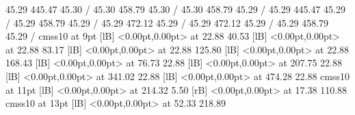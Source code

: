 \documentclass[12pt,a4paper]{report}
\begin{document}
{\setsolid
{} 45.29 445.47 45.30 /
 45.30 458.79 45.30 /
 45.30 458.79 45.29 /
 45.29 445.47 45.29 /
\setsolid
{} 45.29 458.79 45.29 /
 45.29 472.12 45.29 /
 45.29 472.12 45.29 /
 45.29 458.79 45.29 /
\font\picfont cmss10 at 9pt\picfont
{}  [lB] <0.00pt,0.00pt> at 22.88 40.53
  [lB] <0.00pt,0.00pt> at 22.88 83.17
  [lB] <0.00pt,0.00pt> at 22.88 125.80
  [lB] <0.00pt,0.00pt> at 22.88 168.43
  [lB] <0.00pt,0.00pt> at 76.73 22.88
  [lB] <0.00pt,0.00pt> at 207.75 22.88
  [lB] <0.00pt,0.00pt> at 341.02 22.88
  [lB] <0.00pt,0.00pt> at 474.28 22.88
\font\picfont cmss10 at 11pt\picfont
{}  [lB] <0.00pt,0.00pt> at 214.32 5.50
 [rB] <0.00pt,0.00pt> at 17.38 110.88
\font\picfont cmss10 at 13pt\picfont
{}  [lB] <0.00pt,0.00pt> at 52.33 218.89
\endpicture
}
\end{document}
